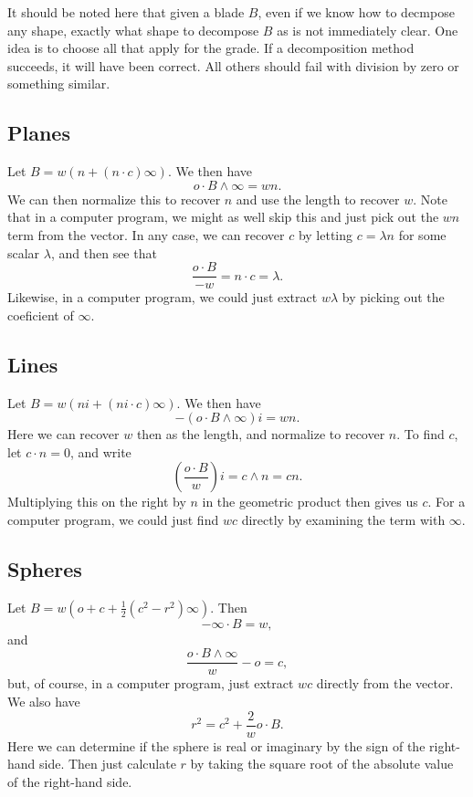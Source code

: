\documentclass[12pt]{article}
\newcommand{\nvao}{o}
\newcommand{\nvai}{\infty}
\begin{document}
It should be noted here that given a blade $B$, even if we know how to decmpose any shape,
exactly what shape to decompose $B$ as is not immediately clear.  One idea is to choose all
that apply for the grade.  If a decomposition method succeeds, it will have been correct.
All others should fail with division by zero or something similar.

\subsection*{Planes}

Let $B=w(n+(n\cdot c)\nvai)$.  We then have
\begin{equation*}
\nvao\cdot B\wedge\nvai = wn.
\end{equation*}
We can then normalize this to recover $n$ and use the length to recover $w$.
Note that in a computer program, we might as well skip this and just pick out the $wn$ term
from the vector.  In any case, we can recover $c$ by letting $c=\lambda n$ for some scalar $\lambda$,
and then see that
\begin{equation*}
\frac{\nvao\cdot B}{-w} = n\cdot c = \lambda.
\end{equation*}
Likewise, in a computer program, we could just extract $w\lambda$ by picking out the coeficient of $\nvai$.

\subsection*{Lines}

Let $B=w(ni + (ni\cdot c)\nvai)$.  We then have
\begin{equation*}
-(\nvao\cdot B\wedge\nvai)i = wn.
\end{equation*}
Here we can recover $w$ then as the length, and normalize to recover $n$.  To find $c$,
let $c\cdot n=0$, and write
\begin{equation*}
\left(\frac{\nvao\cdot B}{w}\right)i = c\wedge n = cn.
\end{equation*}
Multiplying this on the right by $n$ in the geometric product then gives us $c$.
For a computer program, we could just find $wc$ directly by examining the term with $\nvai$.

\subsection*{Spheres}

Let $B=w\left(\nvao + c + \frac{1}{2}(c^2-r^2)\nvai\right)$.
Then
\begin{equation*}
-\nvai\cdot B = w,
\end{equation*}
and
\begin{equation*}
\frac{\nvao\cdot B\wedge\nvai}{w} - \nvao = c,
\end{equation*}
but, of course, in a computer program, just extract $wc$ directly from the vector.
We also have
\begin{equation*}
r^2 = c^2 + \frac{2}{w}\nvao\cdot B.
\end{equation*}
Here we can determine if the sphere is real or imaginary by the sign of the right-hand side.
Then just calculate $r$ by taking the square root of the absolute value of the right-hand side.
\end{document}
